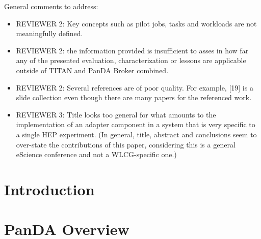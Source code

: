 \documentclass[conference]{IEEEtran}
\begin{document}
\ifreview
General comments to address:
\begin{itemize}
    \color{red} 
    \item REVIEWER 2:  Key concepts such as pilot jobs, tasks and workloads
    are not meaningfully defined.
    \item REVIEWER 2: the information provided is insufficient to asses in
    how far any of the presented evaluation, characterization or lessons are
    applicable outside of TITAN and PanDA Broker combined.
    \item REVIEWER 2: Several references are of poor quality. For example,
    [19] is a slide collection even though there are many papers for the
    referenced work.
    \item REVIEWER 3: Title looks too general for what amounts to the
    implementation of an adapter component in a system that is very specific
    to a single HEP experiment. (In general, title, abstract and conclusions
    seem to over-state the contributions of this paper, considering this is a
    general eScience conference and not a WLCG-specific one.)
\end{itemize}
\fi

\begin{abstract}

\end{abstract}


\section{Introduction}\label{sec:intro}



\section{PanDA Overview}\label{sec:panda_overview}

\end{document}
